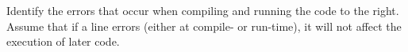 \question Identify the errors that occur when compiling and running the code to the right. 
Assume that if a line errors (either at compile- or run-time), it will not affect the execution of later code.
